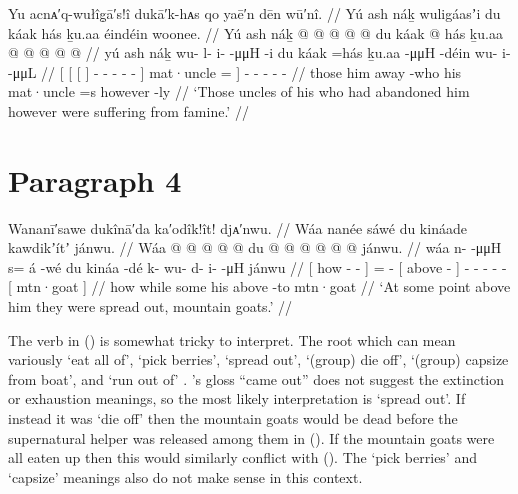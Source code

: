 \ex\label{ex:90-47-uncles-famine}%
%
\begingl
	\glpreamble	Yu acnᴀ′q-wułîg̣ā′s!î dukā′k-hᴀs qo yaē′n dēn wū′nî. //
	\glpreamble	Yú ash náḵ wuligáasʼi du káak hás ḵu.aa éindéin woonee. //
	\gla	{} Yú {} {} ash náḵ {}
				 @ {} @ {} @ {} @ {} @ {} {} 
			du káak @ \•hás {}
		ḵu.aa
		 @ {} @ {}
		 @ {} @ {} @ {} //
	\glb	{} yú {} {} ash náḵ {}
				wu- l- i-  -μμH -i {}
			du káak =hás {}
		ḵu.aa
		 -μμH -déin
		wu- i-  -μμL //
	\glc	{}[  {}[ {}[   {}]
				- - -  - - {}]
			 mat·uncle = {}]
		 - -
		- -  - //
	\gld	{} those {} {} him away {}
				 {} {} {} {} -who {}
			his mat·uncle =s {}
		however
		 {} -ly 
		 {} {} {} //
	\glft	‘Those uncles of his who had abandoned him however were suffering from famine.’
		//
\endgl
\xe

\section{Paragraph 4}\label{sec:90-para-4}

\ex\label{ex:90-48-mtn-goats}%
%
\begingl
	\glpreamble	Wananī′sawe dukînā′da ka′odîk!ît! djᴀ′nwu. //
	\glpreamble	Wáa nanée sáwé du kináade kawdikʼítʼ jánwu. //
	\gla	{} Wáa  @ {} @ {} @ {} {}
		 @ {} @ {}
		{} du  @ {} {}
		 @ {} @ {} @ {} @ {} @ {}
		{} jánwu. {} //
	\glb	{} wáa n-  -μμH {} {} 
		s= á -wé
		{} du kináa -dé {}
		k- wu- d- i-  -μH
		{} jánwu {} //
	\glc	{}[ how -  - \· {}]
		=  -
		{}[  above - {}]
		- - - -  -
		{}[ mtn·goat {}] //
	\gld	{} how  {} {} \·while {}
		some\·  {}
		{} his above -to {}
		 {} {} {} {} {}
		{} mtn·goat {} //
	\glft	‘At some point above him they were spread out, mountain goats.’
		//
\endgl
\xe

The verb  in (\lastx) is somewhat tricky to interpret.
The root  which can mean variously ‘eat all of’, ‘pick berries’, ‘spread out’, ‘(group) die off’, ‘(group) capsize from boat’, and ‘run out of’ \parencites[f04/118–121]{leer:1973}[776]{leer:1976}.
\citeauthor{swanton:1909}’s gloss “came out” does not suggest the extinction or exhaustion meanings, so the most likely interpretation is ‘spread out’.
If instead it was ‘die off’ then the mountain goats would be dead before the supernatural helper was released among them in (\nextx).
If the mountain goats were all eaten up then this would similarly conflict with (\nextx).
The ‘pick berries’ and ‘capsize’ meanings also do not make sense in this context.

